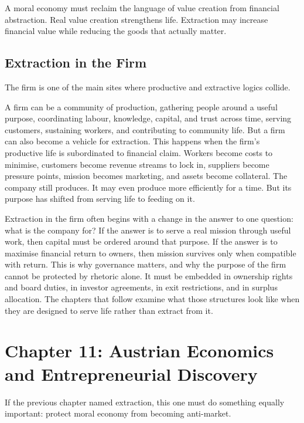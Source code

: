 \documentclass[11pt,a4paper,oneside]{book}
\begin{document}
A moral economy must reclaim the language of value creation from financial abstraction. Real value creation strengthens life. Extraction may increase financial value while reducing the goods that actually matter.

\section*{Extraction in the Firm}

The firm is one of the main sites where productive and extractive logics collide.

A firm can be a community of production, gathering people around a useful purpose, coordinating labour, knowledge, capital, and trust across time, serving customers, sustaining workers, and contributing to community life. But a firm can also become a vehicle for extraction. This happens when the firm's productive life is subordinated to financial claim. Workers become costs to minimise, customers become revenue streams to lock in, suppliers become pressure points, mission becomes marketing, and assets become collateral. The company still produces. It may even produce more efficiently for a time. But its purpose has shifted from serving life to feeding on it.

Extraction in the firm often begins with a change in the answer to one question: what is the company for? If the answer is to serve a real mission through useful work, then capital must be ordered around that purpose. If the answer is to maximise financial return to owners, then mission survives only when compatible with return. This is why governance matters, and why the purpose of the firm cannot be protected by rhetoric alone. It must be embedded in ownership rights and board duties, in investor agreements, in exit restrictions, and in surplus allocation. The chapters that follow examine what those structures look like when they are designed to serve life rather than extract from it.

\chapter*{Chapter 11: Austrian Economics and Entrepreneurial Discovery}

If the previous chapter named extraction, this one must do something equally important: protect moral economy from becoming anti-market.
\end{document}
